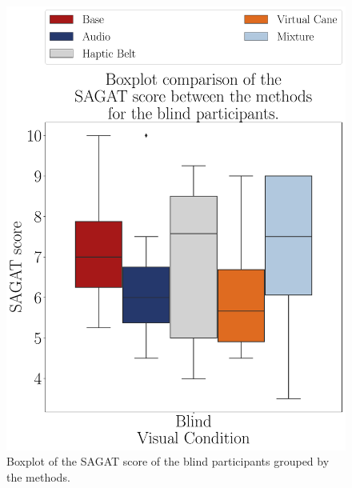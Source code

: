 
\begin{figure}[!htb]
    \centering
    \includegraphics[width = 0.75\linewidth]{Resultados/Sagat/Figuras/pdf/boxplot_sagat_blind_scene.pdf}
    \caption{Boxplot of the SAGAT score of the blind participants grouped by the methods.}
    \label{fig:boxplot_sagat_blind_scene}
\end{figure}

